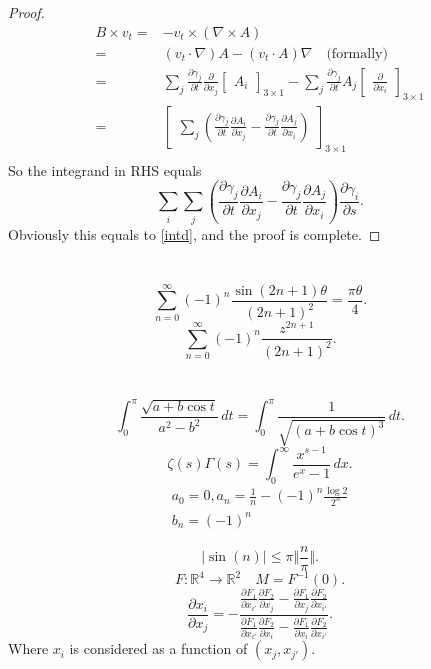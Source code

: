 \documentclass[12pt]{article}
\begin{document}
\begin{proof}
\begin{equation}
    \begin{aligned}
      B\times v_t=& -v_t\times (\nabla \times A) \\
      =& (v_t\cdot \nabla)A-(v_t\cdot A)\nabla\quad\text{(formally)} \\
      =& \sum_j \frac{\partial \gamma_j}{\partial t} \frac{\partial}{\partial x_j}\begin{bmatrix} \displaystyle A_i \end{bmatrix}_{3\times 1}-\sum_j \frac{\partial \gamma_j}{\partial t}A_j \begin{bmatrix}\displaystyle \frac{\partial}{\partial x_i} \end{bmatrix}_{3\times 1} \\
      =& \begin{bmatrix} \displaystyle \sum_j ( \frac{\partial \gamma_j}{\partial t} \frac{\partial A_i}{\partial x_j} - \frac{\partial \gamma_j}{\partial t} \frac{\partial A_j}{\partial x_i} ) \end{bmatrix}_{3\times 1} \\
    \end{aligned}
  \end{equation}
  So the integrand in RHS equals
  \[
    \sum_i\sum_j (\frac{\partial \gamma_j}{\partial t} \frac{\partial A_i}{\partial x_j} - \frac{\partial \gamma_j}{\partial t} \frac{\partial A_j}{\partial x_i} )\frac{\partial \gamma_i}{\partial s}
  .\]
  Obviously this equals to \cref{intd}, and the proof is complete.
\end{proof}

\section{}
\[
  \sum_{n=0}^{\infty} (-1)^n\frac{\sin(2n+1)\theta}{(2n+1)^2}=\frac{\pi\theta}{4}
.\]
\[
  \sum_{n=0}^{\infty} (-1)^n\frac{z^{2n+1}}{(2n+1)^2}
.\]

\section{}
\[
  \int_0^\pi \frac{\sqrt{a+b\cos t}}{a^2-b^2} \,dt=\int_0^\pi \frac{1}{\sqrt{(a+b\cos t)^3} }\,dt
.\]
\[
  \zeta(s)\Gamma(s)=\int_0^\infty \frac{x^{s-1}}{e^x-1}\,dx
.\]
\begin{gather*}
  a_0=0,a_n=\frac{1}{n}-(-1)^n \frac{\log 2}{2^n}\\
  b_n=(-1)^n
\end{gather*}

\[
  |\sin(n)| \le \pi\Vert \frac{n}{\pi} \Vert
.\]
\[
  F:\mathbb{R}^4\to \mathbb{R}^2 \quad M=F^{-1}(0)
.\]
\[
  \frac{\partial x_i}{\partial x_j}=-\frac{\frac{\partial F_1}{\partial x_{i'}} \frac{\partial F_2}{\partial x_j} -\frac{\partial F_1}{\partial x_j} \frac{\partial F_2}{\partial x_{i'}} }{\frac{\partial F_1}{\partial x_{i'}} \frac{\partial F_2}{\partial x_i} -\frac{\partial F_1}{\partial x_i} \frac{\partial F_2}{\partial x_{i'}} }
.\]
Where \(x_i\) is considered as a function of \((x_j,x_{j'})\).
\end{document}
